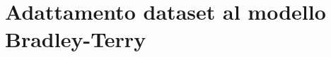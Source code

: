 \section{Adattamento dataset al modello Bradley-Terry}
\begin{comment}
	\begin{table}[h]%
		\rowcolors{2}{grigetto}{white}
		\renewcommand{\arraystretch}{1.7}
		\centering
		\begin{tabularx}{\textwidth}{c c X}
			\hline	
			\rowcolor{heavenly}
			\intest{Durata in ore} & \intest{Date (inizio - fine)} & \intest{Attività} \\	
			\hline			
			24 &  01/07/2020 - 03/07/2020 & Studio delle tecnologie Angular 2+ e Ionic, da utilizzare durante lo stage.\\
			
			40 &  06/07/2020 - 10/07/2020 & Studio di componenti dell'architettura di sistema di Azzurra, creazione di \emph{test} per la \emph{dashboard} di \gls{AWMS} e per l'applicazione \emph{mobile}. \\
			
			40 &  13/07/2020 - 17/07/2020 & Continuazione studio delle componenti del sistema di Azzurra, analisi, progettazione e implementazione di flussi conversazionali.\\
			
			40 &  20/07/2020 - 24/07/2020 & Documentazione per le componenti di Azzurra.\\
			
			40 &  27/07/2020 - 31/07/2020 & Continuazione studio di altre componenti di \gls{AWMS}.\\
			
			40 &  03/08/2020 - 07/08/2020 & Documentazione delle componenti \gls{AWMS} e implementazione \glslink{notifica push}{notifiche push}\textcolor{SchoolColor}{\ap{[g]}}.\\
			
			40 &  17/08/2020 - 21/08/2020 & Progettazione, implementazione e documentazione di \emph{template engine} multi-lingua.\\
			
			40 &  24/08/2020 - 28/08/2020 & Studio della gestione dei comportamenti \emph{mobile} \emph{application} in condizioni di mancanza di connettività.\\
			
			16 &  31/08/2020 - 01/09/2020 & Continuazione ottava settimana. \\
			\hline
		\end{tabularx} \hbox{}
		
		\caption{Tabella riassuntiva delle attività pianificate per il progetto di stage}
	\end{table}
\end{comment}

